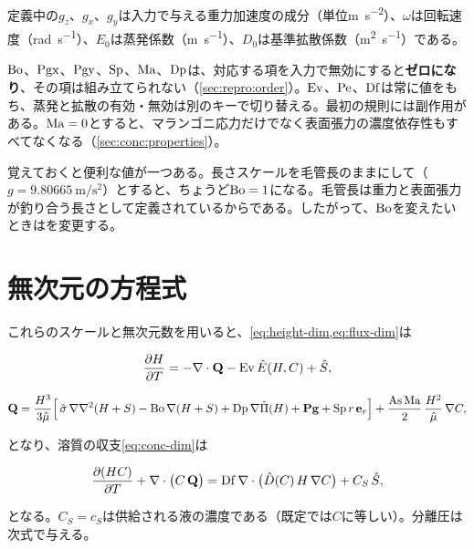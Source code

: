 定義中の$g_z$、$g_x$、$g_y$は入力で与える重力加速度の成分（単位\si{\metre\per\second\squared}）、$\omega$は回転速度（\si{\radian\per\second}）、$E_0$は蒸発係数（\si{\metre\per\second}）、$D_0$は基準拡散係数（\si{\metre\squared\per\second}）である。

$\mathrm{Bo}$、$\mathrm{Pgx}$、$\mathrm{Pgy}$、$\mathrm{Sp}$、$\mathrm{Ma}$、$\mathrm{Dp}$は、対応する項を入力で無効にすると\textbf{ゼロになり}、その項は組み立てられない（\cref{sec:repro:order}）。$\mathrm{Ev}$、$\mathrm{Pe}$、$\mathrm{Df}$は常に値をもち、蒸発と拡散の有効・無効は別のキーで切り替える。最初の規則には副作用がある。$\mathrm{Ma} = 0$とすると、マランゴニ応力だけでなく表面張力の濃度依存性もすべてなくなる（\cref{sec:conc:properties}）。

覚えておくと便利な値が一つある。長さスケールを毛管長のままにして（$g = \SI{9.80665}{\metre\per\second\squared}$）とすると、ちょうど$\mathrm{Bo} = 1$になる。毛管長は重力と表面張力が釣り合う長さとして定義されているからである。したがって、$\mathrm{Bo}$を変えたいときはを変更する。

\section{無次元の方程式}
\label{sec:governing:nondim}

これらのスケールと無次元数を用いると、\cref{eq:height-dim,eq:flux-dim}は

\begin{equation}\label{eq:height}
  \frac{\partial H}{\partial T} = -\nabla\cdot\mathbf{Q} - \mathrm{Ev}\,\hat{E}(H,C) + \hat{S},
\end{equation}

\begin{equation}\label{eq:flux}
  \mathbf{Q} = \frac{H^{3}}{3\hat{\mu}}
    \Bigl[\,\hat{\sigma}\,\nabla\nabla^{2}(H+S)
      - \mathrm{Bo}\,\nabla(H+S)
      + \mathrm{Dp}\,\nabla\hat{\Pi}(H)
      + \mathbf{Pg}
      + \mathrm{Sp}\,r\,\mathbf{e}_r \Bigr]
    + \frac{\mathrm{As}\,\mathrm{Ma}}{2}\,\frac{H^{2}}{\hat{\mu}}\,\nabla C,
\end{equation}

となり、溶質の収支\cref{eq:conc-dim}は

\begin{equation}\label{eq:conc}
  \frac{\partial (HC)}{\partial T} + \nabla\cdot\bigl(C\,\mathbf{Q}\bigr)
    = \mathrm{Df}\,\nabla\cdot\bigl(\hat{D}(C)\,H\,\nabla C\bigr) + C_S\,\hat{S},
\end{equation}

となる。$C_S = c_S$は供給される液の濃度である（既定では$C$に等しい）。分離圧は次式で与える。

